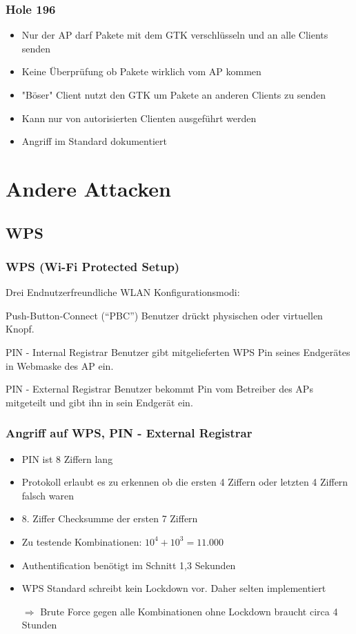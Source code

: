 \documentclass{beamer}
\begin{document}
\begin{frame}
\frametitle{Hole 196}
\begin{itemize}
	\item Nur der AP darf Pakete mit dem GTK verschlüsseln und an alle Clients senden
	\item Keine Überprüfung ob Pakete wirklich vom AP kommen
    \item "Böser" Client nutzt den GTK um Pakete an anderen Clients zu senden
	\item Kann nur von autorisierten Clienten ausgeführt werden
	\item Angriff im Standard dokumentiert
\end{itemize}
\end{frame}

\section{Andere Attacken}
\subsection{WPS}

\begin{frame}
\frametitle{WPS (Wi-Fi Protected Setup)}
Drei Endnutzerfreundliche WLAN Konfigurationsmodi:
\begin{block}{Push-Button-Connect (“PBC”)}
Benutzer drückt physischen oder virtuellen Knopf.
\end{block}
\begin{block}{PIN - Internal Registrar}
Benutzer gibt mitgelieferten WPS Pin seines Endgerätes in Webmaske des AP ein.
\end{block}
\begin{block}{PIN - External Registrar}
Benutzer bekommt Pin vom Betreiber des APs mitgeteilt und gibt ihn in sein Endgerät ein.
\end{block}
\end{frame}


\begin{frame}
\frametitle{Angriff auf WPS, PIN - External Registrar \cite{wps_attack}}
\begin{itemize}
	\item PIN ist 8 Ziffern lang
	\item Protokoll erlaubt es zu erkennen ob die ersten 4 Ziffern oder letzten 4 Ziffern falsch waren
	\item 8. Ziffer Checksumme der ersten 7 Ziffern
	\item Zu testende Kombinationen: $10^4+10^3 = 11.000$
	\item Authentification benötigt im Schnitt 1,3 Sekunden
	\item WPS Standard schreibt kein Lockdown vor. Daher selten implementiert
	\item[$\Rightarrow$] Brute Force gegen alle Kombinationen ohne Lockdown braucht circa 4 Stunden
\end{itemize}
\end{frame}
\end{document}
